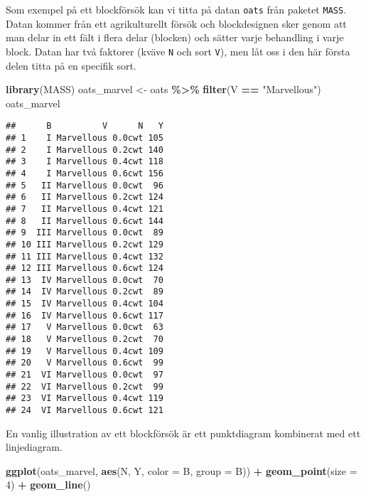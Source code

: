 \documentclass[
]{book}
\newenvironment{Shaded}{\begin{snugshade}}{\end{snugshade}}
\newcommand{\AttributeTok}[1]{\textcolor[rgb]{0.13,0.29,0.53}{#1}}
\newcommand{\DecValTok}[1]{\textcolor[rgb]{0.00,0.00,0.81}{#1}}
\newcommand{\FunctionTok}[1]{\textcolor[rgb]{0.13,0.29,0.53}{\textbf{#1}}}
\newcommand{\NormalTok}[1]{#1}
\newcommand{\OtherTok}[1]{\textcolor[rgb]{0.56,0.35,0.01}{#1}}
\newcommand{\SpecialCharTok}[1]{\textcolor[rgb]{0.81,0.36,0.00}{\textbf{#1}}}
\newcommand{\StringTok}[1]{\textcolor[rgb]{0.31,0.60,0.02}{#1}}
\theoremstyle{definition}
\theoremstyle{definition}
\theoremstyle{definition}
\theoremstyle{definition}
\theoremstyle{remark}
\begin{document}
Som exempel på ett blockförsök kan vi titta på datan \texttt{oats} från paketet \texttt{MASS}. Datan kommer från ett agrikulturellt försök och blockdesignen sker genom att man delar in ett fält i flera delar (blocken) och sätter varje behandling i varje block. Datan har två faktorer (kväve \texttt{N} och sort \texttt{V}), men låt oss i den här första delen titta på en specifik sort.

\begin{Shaded}
\begin{Highlighting}[]
\FunctionTok{library}\NormalTok{(MASS)}
\NormalTok{oats\_marvel }\OtherTok{\textless{}{-}}\NormalTok{ oats }\SpecialCharTok{\%\textgreater{}\%} \FunctionTok{filter}\NormalTok{(V }\SpecialCharTok{==} \StringTok{"Marvellous"}\NormalTok{)}
\NormalTok{oats\_marvel}
\end{Highlighting}
\end{Shaded}

\begin{verbatim}
##      B          V      N   Y
## 1    I Marvellous 0.0cwt 105
## 2    I Marvellous 0.2cwt 140
## 3    I Marvellous 0.4cwt 118
## 4    I Marvellous 0.6cwt 156
## 5   II Marvellous 0.0cwt  96
## 6   II Marvellous 0.2cwt 124
## 7   II Marvellous 0.4cwt 121
## 8   II Marvellous 0.6cwt 144
## 9  III Marvellous 0.0cwt  89
## 10 III Marvellous 0.2cwt 129
## 11 III Marvellous 0.4cwt 132
## 12 III Marvellous 0.6cwt 124
## 13  IV Marvellous 0.0cwt  70
## 14  IV Marvellous 0.2cwt  89
## 15  IV Marvellous 0.4cwt 104
## 16  IV Marvellous 0.6cwt 117
## 17   V Marvellous 0.0cwt  63
## 18   V Marvellous 0.2cwt  70
## 19   V Marvellous 0.4cwt 109
## 20   V Marvellous 0.6cwt  99
## 21  VI Marvellous 0.0cwt  97
## 22  VI Marvellous 0.2cwt  99
## 23  VI Marvellous 0.4cwt 119
## 24  VI Marvellous 0.6cwt 121
\end{verbatim}

En vanlig illustration av ett blockförsök är ett punktdiagram kombinerat med ett linjediagram.

\begin{Shaded}
\begin{Highlighting}[]
\FunctionTok{ggplot}\NormalTok{(oats\_marvel, }\FunctionTok{aes}\NormalTok{(N, Y, }\AttributeTok{color =}\NormalTok{ B, }\AttributeTok{group =}\NormalTok{ B)) }\SpecialCharTok{+}
  \FunctionTok{geom\_point}\NormalTok{(}\AttributeTok{size =} \DecValTok{4}\NormalTok{) }\SpecialCharTok{+}
  \FunctionTok{geom\_line}\NormalTok{()}
\end{Highlighting}
\end{Shaded}
\end{document}
